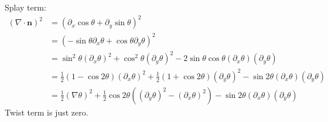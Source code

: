 \documentclass[reqno]{article}
\begin{document}
\noindent
Splay term:
\begin{equation}
\begin{split}
    (\nabla \cdot \mathbf{n})^2 
    &= (\partial_x \cos\theta + \partial_y \sin\theta)^2 \\
    &= (-\sin\theta \partial_x \theta + \cos\theta \partial_y \theta)^2 \\
    &= \sin^2\theta (\partial_x \theta)^2 + \cos^2 \theta (\partial_y \theta)^2
    - 2 \sin\theta\cos\theta (\partial_x \theta)(\partial_y \theta) \\
    &= 
    \tfrac12 (1 - \cos2\theta) (\partial_x \theta)^2
    + \tfrac12 (1 + \cos2\theta) (\partial_y \theta)^2
    - \sin2\theta (\partial_x \theta)(\partial_y \theta) \\
    &=
    \tfrac12 (\nabla \theta)^2 
    + \tfrac12 \cos2\theta \left((\partial_y \theta)^2 - (\partial_x \theta)^2\right)
    - \sin2\theta (\partial_x \theta)(\partial_y \theta)
\end{split}
\end{equation}
Twist term is just zero.
\end{document}
